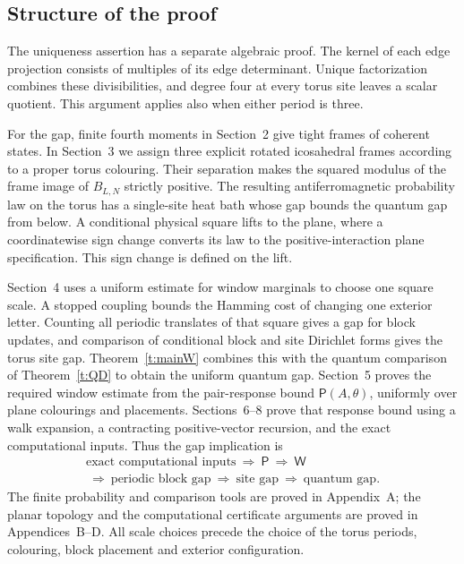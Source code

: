 \subsection{Structure of the proof}

The uniqueness assertion has a separate algebraic proof. The kernel
of each edge projection consists of multiples of its edge determinant.
Unique factorization combines these divisibilities, and degree four
at every torus site leaves a scalar quotient. This argument applies
also when either period is three.

For the gap, finite fourth moments in Section~2 give tight frames of
coherent states. In Section~3 we assign three explicit rotated
icosahedral frames according to a proper torus colouring. Their
separation makes the squared modulus of the frame image of
\(B_{L,N}\) strictly positive. The resulting antiferromagnetic
probability law on the torus has a single-site heat bath whose gap
bounds the quantum gap from below. A conditional physical square
lifts to the plane, where a coordinatewise sign change converts its
law to the positive-interaction plane specification. This sign
change is defined on the lift.

Section~4 uses a uniform estimate for window marginals to choose one
square scale. A stopped coupling bounds the Hamming cost of changing
one exterior letter. Counting all periodic translates of that square
gives a gap for block updates, and comparison of conditional block
and site Dirichlet forms gives the torus site gap.
Theorem~\ref{t:mainW} combines this with the quantum comparison of
Theorem~\ref{t:QD} to obtain the uniform quantum gap.
Section~5 proves the required window estimate from the pair-response
bound \(\mathsf P(A,\theta)\), uniformly over plane colourings and
placements. Sections~6--8 prove that response bound using a walk
expansion, a contracting positive-vector recursion, and the exact
computational inputs. Thus the gap implication is
\[
 \begin{gathered}
 \text{exact computational inputs}
 \ \Longrightarrow\ \mathsf P
 \ \Longrightarrow\ \mathsf W\\
 \ \Longrightarrow\ \text{periodic block gap}
 \ \Longrightarrow\ \text{site gap}
 \ \Longrightarrow\ \text{quantum gap}.
 \end{gathered}
\]
The finite probability and comparison tools are proved in Appendix~A;
the planar topology and the computational certificate arguments are
proved in Appendices~B--D. All scale choices precede the choice of the
torus periods, colouring, block placement and exterior configuration.

